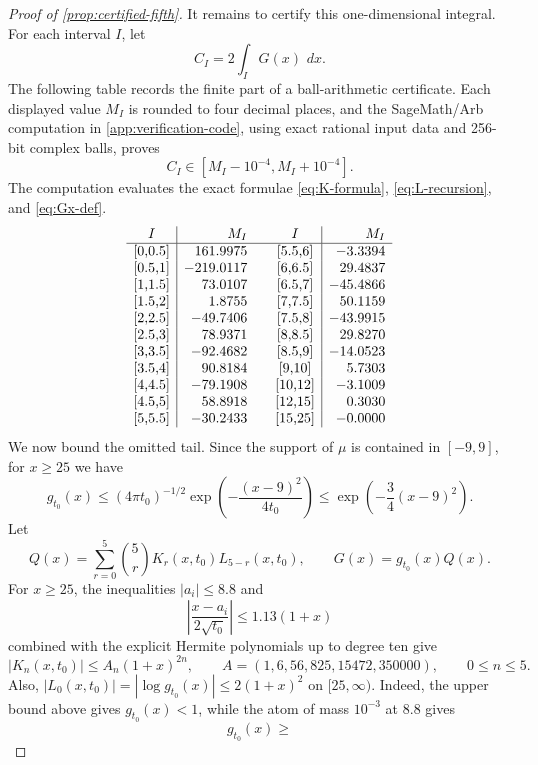 \documentclass[11pt]{article}
\newcommand{\dd}{\,d}
\begin{document}
\begin{proof}[Proof of \cref{prop:certified-fifth}]
It remains to certify this one-dimensional integral. For each interval \(I\), let
\[
   C_I=2\int_I G(x)\,\dd x.
\]
The following table records the finite part of a ball-arithmetic certificate. Each displayed value \(M_I\) is rounded to four decimal places, and the SageMath/Arb computation in \cref{app:verification-code}, using exact rational input data and 256-bit complex balls, proves
\begin{equation}\label{eq:table-cert-radius}
   C_I\in[M_I-10^{-4},M_I+10^{-4}].
\end{equation}
The computation evaluates the exact formulae \eqref{eq:K-formula}, \eqref{eq:L-recursion}, and \eqref{eq:Gx-def}.
\[
\begin{array}{c|r@{\qquad}c|r}
I & M_I & I & M_I \\
\hline
$[0,0.5]$ & 161.9975 & $[5.5,6]$ & -3.3394\\
$[0.5,1]$ & -219.0117 & $[6,6.5]$ & 29.4837\\
$[1,1.5]$ & 73.0107 & $[6.5,7]$ & -45.4866\\
$[1.5,2]$ & 1.8755 & $[7,7.5]$ & 50.1159\\
$[2,2.5]$ & -49.7406 & $[7.5,8]$ & -43.9915\\
$[2.5,3]$ & 78.9371 & $[8,8.5]$ & 29.8270\\
$[3,3.5]$ & -92.4682 & $[8.5,9]$ & -14.0523\\
$[3.5,4]$ & 90.8184 & $[9,10]$ & 5.7303\\
$[4,4.5]$ & -79.1908 & $[10,12]$ & -3.1009\\
$[4.5,5]$ & 58.8918 & $[12,15]$ & 0.3030\\
$[5,5.5]$ & -30.2433 & $[15,25]$ & -0.0000
\end{array}
\]
We now bound the omitted tail. Since the support of \(\mu\) is contained in \([-9,9]\), for \(x\ge25\) we have
\[
   g_{t_0}(x)
   \le
   (4\pi t_0)^{-1/2}
   \exp\left(-\frac{(x-9)^2}{4t_0}\right)
   \le
   \exp\left(-\frac34(x-9)^2\right).
\]
Let
\[
   Q(x)=\sum_{r=0}^{5}\binom{5}{r}K_r(x,t_0)L_{5-r}(x,t_0),
   \qquad G(x)=g_{t_0}(x)Q(x).
\]
For \(x\ge25\), the inequalities \(|a_i|\le8.8\) and
\[
   \left|\frac{x-a_i}{2\sqrt{t_0}}\right|
   \le 1.13(1+x)
\]
combined with the explicit Hermite polynomials up to degree ten give
\[
   |K_n(x,t_0)|\le A_n(1+x)^{2n},
   \qquad
   A=(1,6,56,825,15472,350000),
   \qquad 0\le n\le5.
\]
Also, \(|L_0(x,t_0)|=|\log g_{t_0}(x)|\le2(1+x)^2\) on
\([25,\infty)\). Indeed, the upper bound above gives \(g_{t_0}(x)<1\), while
the atom of mass \(10^{-3}\) at \(8.8\) gives
\[
   g_{t_0}(x)\ge
\]
\end{proof}
\end{document}
